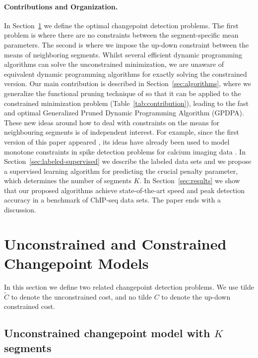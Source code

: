 \documentclass[twoside,11pt]{article}
\begin{document}
\paragraph{Contributions and Organization.} In
Section~\ref{sec:models} we define the optimal changepoint detection
problems. The first problem is where there are no constraints between the
segment-specific mean parameters. The second
is where we impose the up-down constraint
between the means of neighboring segments. Whilst
several efficient dynamic programming algorithms can solve the
unconstrained minimization, we are unaware of equivalent dynamic
programming algorithms for exactly solving the constrained version.
Our main contribution is described in Section~\ref{sec:algorithms},
where we generalize the functional pruning technique of
\citet{pruned-dp} so that it can be applied to the constrained
minimization problem (Table~\ref{tab:contribution}), leading to the fast and optimal Generalized Pruned Dynamic Programming
Algorithm (GPDPA). 
These new ideas around how to deal with constraints on the means for 
neighbouring segments is of independent interest. For example, since the 
first version of this paper appeared \citep{Hocking-constrained-changepoint-detection}, its ideas have already been used to 
model monotone constraints in spike detection problems for calcium imaging 
data \citep{Jewell2018}.
In Section~\ref{sec:labeled-supervised} we describe the labeled data sets and we propose a supervised learning algorithm for predicting the crucial penalty parameter, which determines the number of segments $K$. In Section~\ref{sec:results} we show that our proposed algorithms
achieve state-of-the-art speed and peak detection accuracy in a
benchmark of ChIP-seq data sets. The paper ends with a
discussion.

\section{Unconstrained and Constrained Changepoint Models}
\label{sec:models}

In this section we define two related changepoint detection
problems. 
We use tilde $\tilde{C}$
to denote the unconstrained cost, and no tilde $C$ to denote the
up-down constrained cost.

\subsection{Unconstrained changepoint model with $K$ segments}
\end{document}

